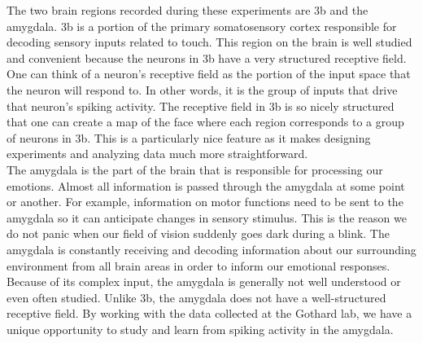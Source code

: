 \documentclass[12pt]{article}
\begin{document}
\indent The two brain regions recorded during these experiments are 3b and the amygdala. 3b is a portion of the primary somatosensory cortex responsible for decoding sensory inputs related to touch. This region on the brain is well studied and convenient because the neurons in 3b have a very structured receptive field. One can think of a neuron's receptive field as the portion of the input space that the neuron will respond to. In other words, it is the group of inputs that drive that neuron's spiking activity. The receptive field in 3b is so nicely structured that one can create a map of the face where each region corresponds to a group of neurons in 3b. This is a particularly nice feature as it makes designing experiments and analyzing data much more straightforward. \\
\indent The amygdala is the part of the brain that is responsible for processing our
emotions. Almost all information is passed through the amygdala at some point or
another. For example, information on motor functions need to be sent to the amygdala
so it can anticipate changes in sensory stimulus. This is the reason we do not
panic when our field of vision suddenly goes dark during a blink. The amygdala is
constantly receiving and decoding information about our surrounding environment from all brain areas in
order to inform our emotional responses. Because of its complex input, the amygdala is generally not well understood or even often studied. Unlike 3b, the amygdala does not have a well-structured receptive field.  By working with the data collected at the Gothard lab,  we have a unique opportunity to study and learn from spiking activity in the amygdala. \\
\end{document}
